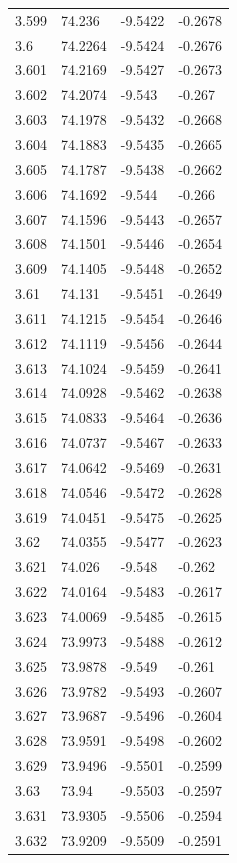 \begin{tabular}{llll}
3.599 & 74.236 & -9.5422 & -0.2678 \\
3.6 & 74.2264 & -9.5424 & -0.2676 \\
3.601 & 74.2169 & -9.5427 & -0.2673 \\
3.602 & 74.2074 & -9.543 & -0.267 \\
3.603 & 74.1978 & -9.5432 & -0.2668 \\
3.604 & 74.1883 & -9.5435 & -0.2665 \\
3.605 & 74.1787 & -9.5438 & -0.2662 \\
3.606 & 74.1692 & -9.544 & -0.266 \\
3.607 & 74.1596 & -9.5443 & -0.2657 \\
3.608 & 74.1501 & -9.5446 & -0.2654 \\
3.609 & 74.1405 & -9.5448 & -0.2652 \\
3.61 & 74.131 & -9.5451 & -0.2649 \\
3.611 & 74.1215 & -9.5454 & -0.2646 \\
3.612 & 74.1119 & -9.5456 & -0.2644 \\
3.613 & 74.1024 & -9.5459 & -0.2641 \\
3.614 & 74.0928 & -9.5462 & -0.2638 \\
3.615 & 74.0833 & -9.5464 & -0.2636 \\
3.616 & 74.0737 & -9.5467 & -0.2633 \\
3.617 & 74.0642 & -9.5469 & -0.2631 \\
3.618 & 74.0546 & -9.5472 & -0.2628 \\
3.619 & 74.0451 & -9.5475 & -0.2625 \\
3.62 & 74.0355 & -9.5477 & -0.2623 \\
3.621 & 74.026 & -9.548 & -0.262 \\
3.622 & 74.0164 & -9.5483 & -0.2617 \\
3.623 & 74.0069 & -9.5485 & -0.2615 \\
3.624 & 73.9973 & -9.5488 & -0.2612 \\
3.625 & 73.9878 & -9.549 & -0.261 \\
3.626 & 73.9782 & -9.5493 & -0.2607 \\
3.627 & 73.9687 & -9.5496 & -0.2604 \\
3.628 & 73.9591 & -9.5498 & -0.2602 \\
3.629 & 73.9496 & -9.5501 & -0.2599 \\
3.63 & 73.94 & -9.5503 & -0.2597 \\
3.631 & 73.9305 & -9.5506 & -0.2594 \\
3.632 & 73.9209 & -9.5509 & -0.2591 \\

\end{tabular}
